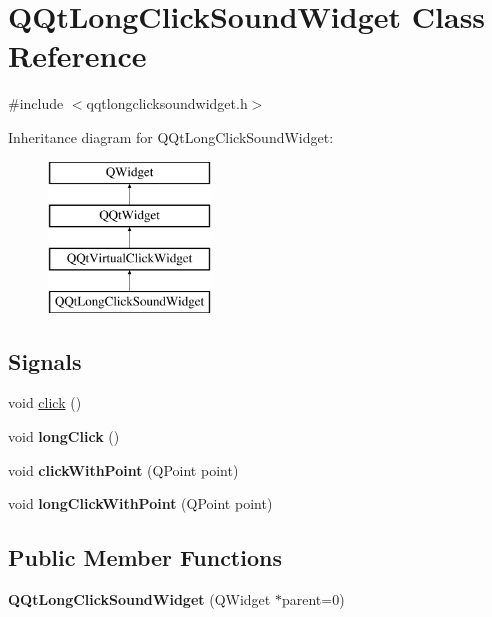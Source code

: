 \hypertarget{class_q_qt_long_click_sound_widget}{}\section{Q\+Qt\+Long\+Click\+Sound\+Widget Class Reference}
\label{class_q_qt_long_click_sound_widget}


{\ttfamily \#include $<$qqtlongclicksoundwidget.\+h$>$}

Inheritance diagram for Q\+Qt\+Long\+Click\+Sound\+Widget\+:\begin{figure}[H]
\begin{center}
\leavevmode
\includegraphics[height=4.000000cm]{class_q_qt_long_click_sound_widget}
\end{center}
\end{figure}
\subsection*{Signals}
\begin{DoxyCompactItemize}
\item 
void \mbox{\hyperlink{class_q_qt_long_click_sound_widget_ae5db4379ed4838b78afab35a825af0a3}{click}} ()
\item 
\mbox{\label{class_q_qt_long_click_sound_widget_a9d0c7934fda34e6ce1e31d1bcf5a503b}} 
void {\bfseries long\+Click} ()
\item 
\mbox{\label{class_q_qt_long_click_sound_widget_a0b6a5b3dd932145ba93fb6e5e6d2d8c6}} 
void {\bfseries click\+With\+Point} (Q\+Point point)
\item 
\mbox{\label{class_q_qt_long_click_sound_widget_a39dc6a6fa867cca6ed8c79403cbd9c51}} 
void {\bfseries long\+Click\+With\+Point} (Q\+Point point)
\end{DoxyCompactItemize}
\subsection*{Public Member Functions}
\begin{DoxyCompactItemize}
\item 
\mbox{\label{class_q_qt_long_click_sound_widget_a2c2ed7b13a9f23cd93063af4d740e29e}} 
{\bfseries Q\+Qt\+Long\+Click\+Sound\+Widget} (Q\+Widget $\ast$parent=0)
\end{DoxyCompactItemize}
